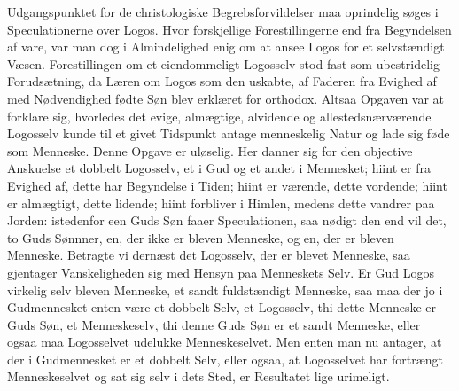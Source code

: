 \documentclass[12pt]{book}
\begin{document}
Udgangspunktet for de christologiske Begrebsforvildelser maa
oprindelig søges i Speculationerne over Logos. Hvor forskjellige
Forestillingerne end fra Begyndelsen af vare, var man dog i
Almindelighed enig om at ansee Logos for et selvstændigt Væsen.
Forestillingen om et eiendommeligt Logosselv stod fast som
ubestridelig Forudsætning, da Læren om Logos som den uskabte, af
Faderen fra Evighed af med Nødvendighed fødte Søn blev erklæret for
orthodox. Altsaa Opgaven var at forklare sig, hvorledes det evige,
almægtige, alvidende og allestedsnærværende Logosselv kunde til et
givet Tidspunkt antage menneskelig Natur og lade sig føde som
Menneske. Denne Opgave er uløselig. Her danner sig for den objective
Anskuelse et dobbelt Logosselv, et i Gud og et andet i Mennesket;
hiint er fra Evighed af, dette har Begyndelse i Tiden; hiint er
værende, dette vordende; hiint er almægtigt, dette lidende; hiint
forbliver i Himlen, medens dette vandrer paa Jorden: istedenfor een
Guds Søn faaer Speculationen, saa nødigt den end vil det, to Guds
Sønnner,
en, der ikke er bleven Menneske, og en, der er bleven
Menneske. Betragte vi dernæst det Logosselv, der er blevet Menneske,
saa gjentager Vanskeligheden sig med Hensyn paa Menneskets Selv. Er
Gud Logos virkelig selv bleven Menneske, et sandt fuldstændigt
Menneske, saa maa der jo i Gudmennesket enten være et dobbelt Selv,
et Logosselv, thi dette Menneske er Guds Søn, et Menneskeselv, thi
denne Guds Søn er et sandt Menneske, eller ogsaa maa Logosselvet
udelukke Menneskeselvet. Men enten man nu antager, at der i
Gudmennesket er et dobbelt Selv, eller ogsaa, at Logosselvet har
fortrængt Menneskeselvet og sat sig selv i dets Sted, er Resultatet
lige urimeligt.
\end{document}

